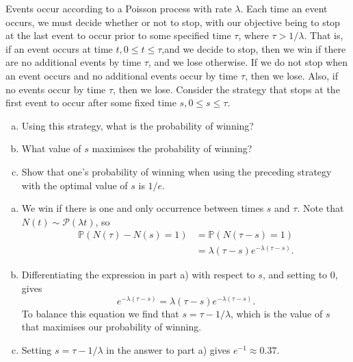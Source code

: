 \begin{problem}{}{}


    Events occur according to a Poisson process with rate $\lambda$. Each time an event occurs, we must decide whether or not to stop, with our objective being to stop at the last event to occur prior to some specified time $\tau$, where $\tau > 1/\lambda$.  That is, if an event occurs at time $t, 0 \leq t \leq \tau$,and we decide to stop, then we win if there are no additional events by time $\tau$, and we lose otherwise. If we do not stop when an event occurs and no additional events occur by time $\tau$, then we lose. Also, if no events occur by time $\tau$, then we lose. Consider the strategy that stops at the first event to occur after some fixed time $s, 0 \leq s \leq \tau$.
    \begin{enumerate}[a)]
        \item Using this strategy, what is the probability of winning?
        \item What value of $s$ maximises the probability of winning?
        \item Show that one's probability of winning when using the preceding strategy with the optimal value of $s$ is $1/e$.
    \end{enumerate}

    \tcblower

    \begin{enumerate}[a)]
        \item We win if there is one and only occurrence between times $s$ and $\tau$. Note that $N(t) \sim \mathcal{P}(\lambda t)$, so
            \begin{align*}
                \mathbb{P}(N(\tau) - N(s) = 1) &= \mathbb{P}(N(\tau - s) = 1) \\
                &= \lambda (\tau - s) e^{-\lambda (\tau - s)} .
            \end{align*}
        \item Differentiating the expression in part a) with respect to $s$, and setting to $0$, gives
            $$ e^{-\lambda (\tau - s)} = \lambda (\tau - s) e^{-\lambda (\tau - s)} . $$
        To balance this equation we find that $s = \tau - 1/\lambda$, which is the value of $s$ that maximises our probability of winning.
        \item Setting $s = \tau - 1/\lambda$ in the answer to part a) gives $e^{-1} \approx 0.37$.
    \end{enumerate}

\end{problem}

